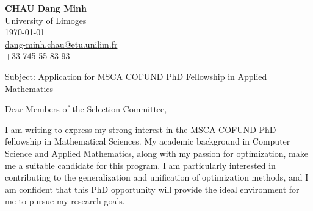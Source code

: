 \documentclass[11pt]{report}
\begin{document}
\begin{titlepage}


    \begin{minipage}[t]{0.95\textwidth}
        \hfill
        \raggedleft
        \textbf{ CHAU Dang Minh} \\
        University of Limoges \\
        \today\\
        \href{mailto:dang-minh.chau@etu.unilim.fr}{dang-minh.chau@etu.unilim.fr} \\
        +33 745 55 83 93 \\
    \end{minipage}


    \vspace{0.7em}

    \raggedright Subject: Application for MSCA COFUND PhD Fellowship in Applied Mathematics

    \vspace{0.7em}

    Dear Members of the Selection Committee,

    \vspace{0.7em}

    I am writing to express my strong interest in the MSCA COFUND PhD fellowship in Mathematical Sciences. My academic background in Computer Science and Applied Mathematics, along with my passion for optimization, make me a suitable candidate for this program. I am particularly interested in contributing to the generalization and unification of optimization methods, and I am confident that this PhD opportunity will provide the ideal environment for me to pursue my research goals.

    \vspace{0.7em}



\end{titlepage}
\end{document}
